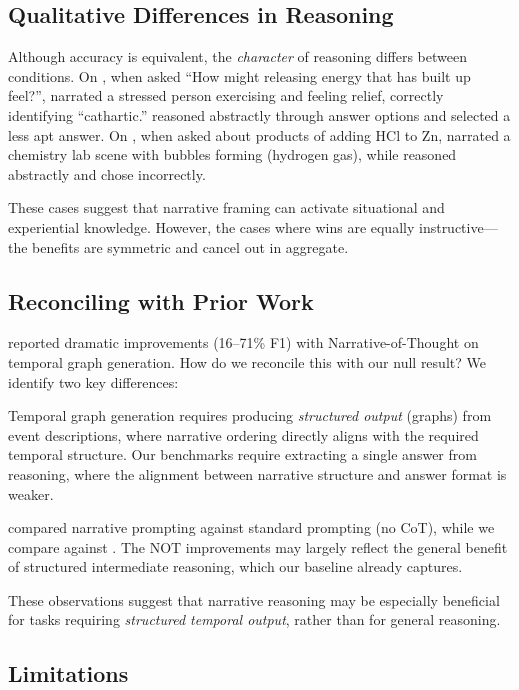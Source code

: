 \subsection{Qualitative Differences in Reasoning}
\label{sec:qualitative}

Although accuracy is equivalent, the \emph{character} of reasoning differs between conditions. On \csqa, when asked ``How might releasing energy that has built up feel?'', \storycot narrated a stressed person exercising and feeling relief, correctly identifying ``cathartic.'' \fewshotcot reasoned abstractly through answer options and selected a less apt answer. On \arc, when asked about products of adding HCl to Zn, \storycot narrated a chemistry lab scene with bubbles forming (hydrogen gas), while \fewshotcot reasoned abstractly and chose incorrectly.

These cases suggest that narrative framing can activate situational and experiential knowledge. However, the cases where \fewshotcot wins are equally instructive---the benefits are symmetric and cancel out in aggregate.

\subsection{Reconciling with Prior Work}
\label{sec:reconciling}

\citet{zhang2024narrative} reported dramatic improvements (16--71\% F1) with Narrative-of-Thought on temporal graph generation. How do we reconcile this with our null result? We identify two key differences:

 Temporal graph generation requires producing \emph{structured output} (graphs) from event descriptions, where narrative ordering directly aligns with the required temporal structure. Our benchmarks require extracting a single answer from reasoning, where the alignment between narrative structure and answer format is weaker.

 \citet{zhang2024narrative} compared narrative prompting against standard prompting (no CoT), while we compare against \fewshotcot. The NOT improvements may largely reflect the general benefit of structured intermediate reasoning, which our \fewshotcot baseline already captures.

These observations suggest that narrative reasoning may be especially beneficial for tasks requiring \emph{structured temporal output}, rather than for general reasoning.

\subsection{Limitations}
\label{sec:limitations}

